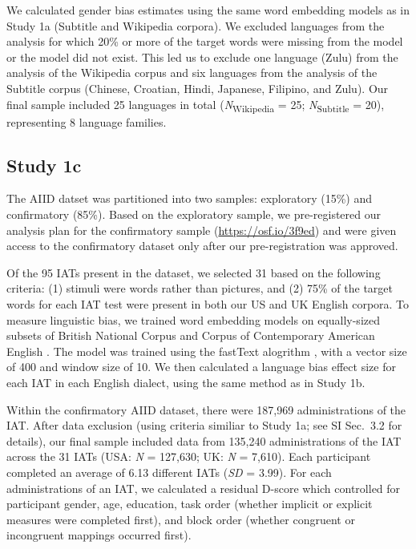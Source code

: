 \documentclass[9pt,twocolumn,twoside]{pnas-new}
\begin{document}
{We calculated gender bias estimates using the same word embedding models
as in Study 1a (Subtitle and Wikipedia corpora). We excluded languages
from the analysis for which 20\% or more of the target words were
missing from the model or the model did not exist. This led us to
exclude one language (Zulu) from the analysis of the Wikipedia corpus
and six languages from the analysis of the Subtitle corpus (Chinese,
Croatian, Hindi, Japanese, Filipino, and Zulu). Our final sample
included 25 languages in total (\emph{N}\textsubscript{Wikipedia} = 25;
\emph{N}\textsubscript{Subtitle} = 20), representing 8 language
families. 


\subsection*{Study 1c}

The AIID datset was partitioned into two samples: exploratory (15\%) and
confirmatory (85\%). Based on the exploratory sample, we pre-registered
our analysis plan for the confirmatory sample
(\url{https://osf.io/3f9ed}) and were given access to the confirmatory dataset only after our pre-registration was approved. 

Of the 95 IATs present in the dataset, we selected 31 based on the following criteria: (1) stimuli were words rather than pictures, and (2) 75\% of the target words for each IAT test were present in both our US and UK English corpora. To measure linguistic bias, we trained word embedding models on equally-sized subsets of British National Corpus \citep[BNC;][]{burnard1995users} and Corpus of Contemporary American English \citep[COCA;][]{davies2008corpus}. The model was trained using the fastText alogrithm \cite{joulin2016bag}, with a vector size of 400 and  window size of 10. We then calculated a language bias effect size for each IAT in each English dialect, using the same method as in Study 1b. 


Within the confirmatory AIID dataset, there were 187,969 administrations
of the IAT. After data exclusion (using criteria similiar to Study 1a; see SI Sec.\ 3.2 for details), our final sample
included data from 135,240 administrations of the IAT across the 31 IATs (USA: \emph{N} = 127,630; UK: \emph{N} = 7,610). Each participant
completed an average of 6.13 different IATs (\emph{SD} = 3.99). For each administrations of an IAT, we calculated a residual D-score which controlled for participant gender, age, education, task order (whether implicit or explicit measures were completed first), and block order (whether congruent or incongruent mappings occurred first).

}
\end{document}
